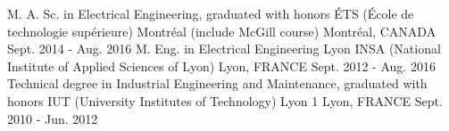 

\begin{cventries}


\cventry
{M. A. Sc. in Electrical Engineering, graduated with honors} %
{ÉTS (École de technologie supérieure) Montréal (include McGill course)} %
{Montréal, CANADA} %
{Sept. 2014 - Aug. 2016} %
{ %
}
\vspace{-1.5mm}
\cventry
{M. Eng. in Electrical Engineering} %
{Lyon INSA (National Institute of Applied Sciences of Lyon)} %
{Lyon, FRANCE} %
{Sept. 2012 - Aug. 2016} %
{ %
}
\vspace{-1mm}
\cventry
{Technical degree in Industrial Engineering and Maintenance, graduated with honors} %
{IUT (University Institutes of Technology) Lyon 1} %
{Lyon, FRANCE} %
{Sept. 2010 - Jun. 2012} %
{ %
}
\vspace{-5mm}
\end{cventries}